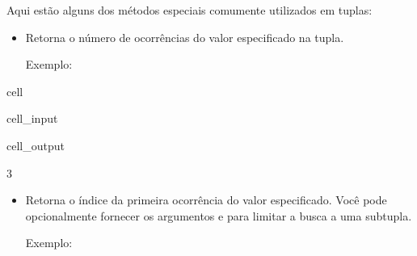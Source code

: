 \documentclass[letterpaper,10pt,english]{jupyterBook}
\begin{document}
\sphinxAtStartPar
Aqui estão alguns dos métodos especiais comumente utilizados em tuplas:
\begin{itemize}
\item {} 
\sphinxAtStartPar
{}
Retorna o número de ocorrências do valor especificado na tupla.

\sphinxAtStartPar
Exemplo:

\end{itemize}

\begin{sphinxuseclass}{cell}\begin{sphinxVerbatimInput}

\begin{sphinxuseclass}{cell_input}
\begin{sphinxVerbatim}[commandchars=\\\{\}]
          
     
\end{sphinxVerbatim}

\end{sphinxuseclass}\end{sphinxVerbatimInput}
\begin{sphinxVerbatimOutput}

\begin{sphinxuseclass}{cell_output}
\begin{sphinxVerbatim}[commandchars=\\\{\}]
3
\end{sphinxVerbatim}

\end{sphinxuseclass}\end{sphinxVerbatimOutput}

\end{sphinxuseclass}\begin{itemize}
\item {} 
\sphinxAtStartPar
{}
Retorna o índice da primeira ocorrência do valor especificado. Você pode opcionalmente fornecer os argumentos  e  para limitar a busca a uma sub\sphinxhyphen{}tupla.

\sphinxAtStartPar
Exemplo:

\end{itemize}
\end{document}
